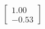 \documentclass[preview]{standalone}
\begin{document}
\begin{align*}
\begin{bmatrix} 1.00 \\ -0.53 \end{bmatrix}
\end{align*}
\end{document}
